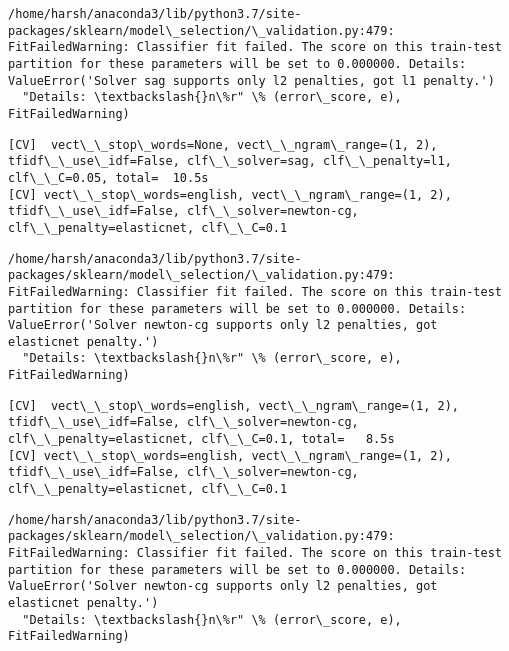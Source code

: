 \documentclass[11pt]{article}
\begin{document}
    \begin{Verbatim}[commandchars=\\\{\}]
/home/harsh/anaconda3/lib/python3.7/site-packages/sklearn/model\_selection/\_validation.py:479: FitFailedWarning: Classifier fit failed. The score on this train-test partition for these parameters will be set to 0.000000. Details: 
ValueError('Solver sag supports only l2 penalties, got l1 penalty.')
  "Details: \textbackslash{}n\%r" \% (error\_score, e), FitFailedWarning)

    \end{Verbatim}

    \begin{Verbatim}[commandchars=\\\{\}]
[CV]  vect\_\_stop\_words=None, vect\_\_ngram\_range=(1, 2), tfidf\_\_use\_idf=False, clf\_\_solver=sag, clf\_\_penalty=l1, clf\_\_C=0.05, total=  10.5s
[CV] vect\_\_stop\_words=english, vect\_\_ngram\_range=(1, 2), tfidf\_\_use\_idf=False, clf\_\_solver=newton-cg, clf\_\_penalty=elasticnet, clf\_\_C=0.1 

    \end{Verbatim}

    \begin{Verbatim}[commandchars=\\\{\}]
/home/harsh/anaconda3/lib/python3.7/site-packages/sklearn/model\_selection/\_validation.py:479: FitFailedWarning: Classifier fit failed. The score on this train-test partition for these parameters will be set to 0.000000. Details: 
ValueError('Solver newton-cg supports only l2 penalties, got elasticnet penalty.')
  "Details: \textbackslash{}n\%r" \% (error\_score, e), FitFailedWarning)

    \end{Verbatim}

    \begin{Verbatim}[commandchars=\\\{\}]
[CV]  vect\_\_stop\_words=english, vect\_\_ngram\_range=(1, 2), tfidf\_\_use\_idf=False, clf\_\_solver=newton-cg, clf\_\_penalty=elasticnet, clf\_\_C=0.1, total=   8.5s
[CV] vect\_\_stop\_words=english, vect\_\_ngram\_range=(1, 2), tfidf\_\_use\_idf=False, clf\_\_solver=newton-cg, clf\_\_penalty=elasticnet, clf\_\_C=0.1 

    \end{Verbatim}

    \begin{Verbatim}[commandchars=\\\{\}]
/home/harsh/anaconda3/lib/python3.7/site-packages/sklearn/model\_selection/\_validation.py:479: FitFailedWarning: Classifier fit failed. The score on this train-test partition for these parameters will be set to 0.000000. Details: 
ValueError('Solver newton-cg supports only l2 penalties, got elasticnet penalty.')
  "Details: \textbackslash{}n\%r" \% (error\_score, e), FitFailedWarning)

    \end{Verbatim}
\end{document}
